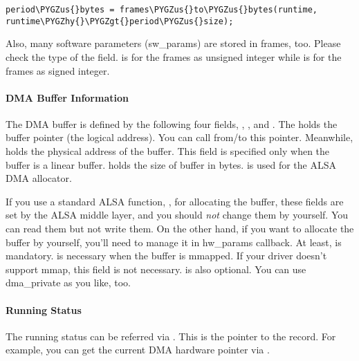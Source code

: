 \documentclass[a4paper,8pt,english]{sphinxmanual}
\def\PYGZus{\char`\_}
\def\PYGZgt{\char`\>}
\def\PYGZhy{\char`\-}
\begin{document}
\begin{Verbatim}[commandchars=\\\{\}]
period\PYGZus{}bytes = frames\PYGZus{}to\PYGZus{}bytes(runtime, runtime\PYGZhy{}\PYGZgt{}period\PYGZus{}size);
\end{Verbatim}

Also, many software parameters (sw\_params) are stored in frames, too.
Please check the type of the field.  is for the
frames as unsigned integer while  is for the
frames as signed integer.


\paragraph{DMA Buffer Information}
\label{sound/kernel-api/writing-an-alsa-driver:dma-buffer-information}
The DMA buffer is defined by the following four fields, ,
,  and . The 
holds the buffer pointer (the logical address). You can call
 from/to this pointer. Meanwhile,  holds
the physical address of the buffer. This field is specified only when
the buffer is a linear buffer.  holds the size of buffer
in bytes.  is used for the ALSA DMA allocator.

If you use a standard ALSA function,
, for allocating the buffer,
these fields are set by the ALSA middle layer, and you should \emph{not}
change them by yourself. You can read them but not write them. On the
other hand, if you want to allocate the buffer by yourself, you'll
need to manage it in hw\_params callback. At least,  is
mandatory.  is necessary when the buffer is mmapped. If
your driver doesn't support mmap, this field is not
necessary.  is also optional. You can use dma\_private as
you like, too.


\paragraph{Running Status}
\label{sound/kernel-api/writing-an-alsa-driver:running-status}
The running status can be referred via . This is
the pointer to the  record. For example, you can get the current
DMA hardware pointer via .
\end{document}

